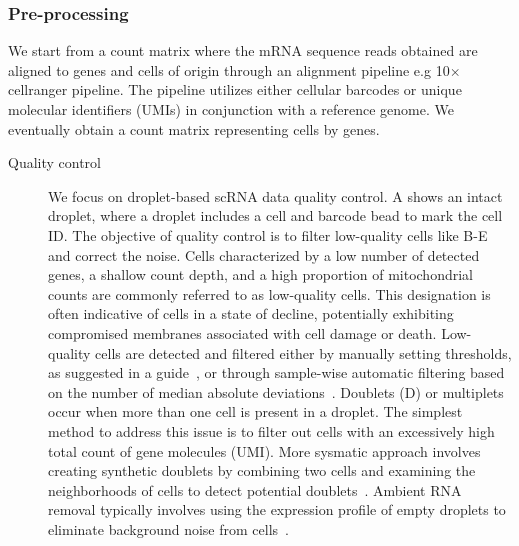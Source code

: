 \subsubsection{Pre-processing}
We start from a count matrix where the mRNA sequence reads obtained are aligned to genes and cells of origin through an alignment pipeline e.g 10$\times$ cellranger pipeline. The pipeline utilizes either cellular barcodes or unique molecular identifiers (UMIs) in conjunction with a reference genome. We eventually obtain a count matrix representing cells by genes.
\begin{description}
	\item[Quality control]
	We focus on droplet-based scRNA data quality control. A shows an intact droplet, where a droplet includes a cell and barcode bead to mark the cell ID. The objective of quality control is to filter low-quality cells like B-E and correct the noise. Cells characterized by a low number of detected genes, a shallow count depth, and a high proportion of mitochondrial counts are commonly referred to as low-quality cells. This designation is often indicative of cells in a state of decline, potentially exhibiting compromised membranes associated with cell damage or death. Low-quality cells are detected and filtered either by manually setting thresholds, as suggested in a guide~\citep{luecken2019current}, or through sample-wise automatic filtering based on the number of median absolute deviations~\citep{germain2020pipecomp}. Doublets (D) or multiplets occur when more than one cell is present in a droplet. The simplest method to address this issue is to filter out cells with an excessively high total count of gene molecules (UMI). More sysmatic approach involves creating synthetic doublets by combining two cells and examining the neighborhoods of cells to detect potential doublets~\citep{mcginnis2019doubletfinder}. Ambient RNA removal typically involves using the expression profile of empty droplets to eliminate background noise from cells~\citep{janssen2023benchambient}.



\end{description}
